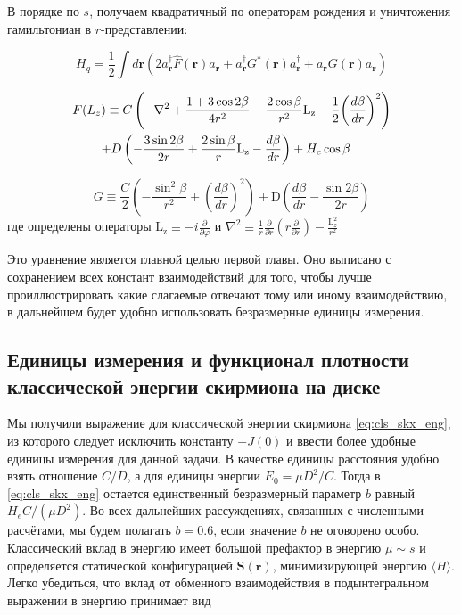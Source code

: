 \documentclass[a4paper,article,14pt]{extarticle}
\begin{document}
В порядке по $s$, получаем квадратичный по операторам рождения и уничтожения гамильтониан в $r$-представлении:

\begin{equation}
\label{eq:HamQuantBose}
{H_q} = \frac{1}{2}\int {d\mathbf{r} \left( {2a_{\mathbf{r}}^\dag \hat F\left( {\mathbf{r}} \right){a_{\mathbf{r}}} + a_{\mathbf{r}}^\dag G^*\left( {\mathbf{r}} \right)a_{\mathbf{r}}^\dag  + {a_{\mathbf{r}}}{G}\left( {\mathbf{r}} \right){a_{\mathbf{r}}}} \right)}
\end{equation}

\[\begin{gathered}
  F({L_z}) \equiv C\left( { - \nabla ^ 2  + \frac{{1 + 3\cos 2\beta }}{{4{r^2}}} - \frac{{2\cos \beta }}{{{r^2}}}{{\text{L}}_{\text{z}}} - \frac{1}{2}{{\left( {\frac{{d\beta }}{{dr}}} \right)}^2}} \right) \hfill \\
  \,\,\,\,\,\,\,\,\,\,\,\,\,\, + D\left( { - \frac{{3\sin 2\beta }}{{2r}} + \frac{{2\sin \beta }}{r}{{\text{L}}_{\text{z}}} - \frac{{d\beta }}{{dr}}} \right) + H_e \cos \beta  \hfill \\ 
\end{gathered} \]

\[G \equiv \frac{C}{2}\left( { - \frac{{{{\sin }^2}\beta }}{{{r^2}}} + {{\left( {\frac{{d\beta }}{{dr}}} \right)}^2}} \right) + {\text{D}}\left( {\frac{{d\beta }}{{dr}} - \frac{{\sin 2\beta }}{{2r}}} \right)\]
где определены операторы ${{\text{L}}_{\text{z}}} \equiv  - i\frac{\partial }{{\partial \varphi }}$
и 
$\nabla ^ 2  \equiv \frac{1}{r}\frac{\partial }{{\partial r}}\left( {r\frac{\partial }{{\partial r}}} \right) - \frac{{{\text{L}}_z^2}}{{{r^2}}}$ 

Это уравнение является главной целью первой главы. Оно выписано с сохранением всех констант взаимодействий для того, чтобы лучше проиллюстрировать какие слагаемые отвечают тому или иному взаимодействию, в дальнейшем  будет удобно использовать безразмерные единицы измерения.

\subsection{Единицы измерения и функционал плотности классической энергии скирмиона на диске }
Мы получили выражение для классической энергии скирмиона \eqref{eq:cls_skx_eng}, из которого следует исключить константу $-J(0)$ и ввести более удобные единицы измерения для данной задачи. В качестве единицы расстояния удобно взять отношение $C/D$, а для единицы энергии $E_{0} = \mu D^{2}/ C$. Тогда в \eqref{eq:cls_skx_eng} остается единственный безразмерный параметр $b$ равный $H_e C/(\mu D^2)$. Во всех дальнейших рассуждениях, связанных с численными расчётами, мы будем полагать $b=0.6$, если значение $b$ не оговорено особо.  Классический вклад в энергию имеет большой префактор в энергию $\mu \sim s$ и определяется статической конфигурацией $\mathbf{S}(\mathbf{r}) $, минимизирующей энергию $\langle H\rangle$.  Легко убедиться, что вклад от обменного взаимодействия в подынтегральном выражении в энергию принимает вид
\end{document}
